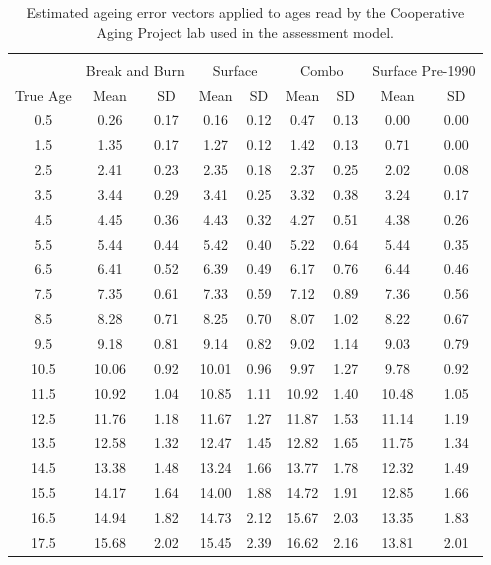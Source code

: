 \documentclass[12pt,]{article}
\begin{document}
\newpage

\FloatBarrier

\begin{table}[ht]
\centering
\caption{Estimated ageing error vectors applied to ages read by the Cooperative Aging Project lab used in the assessment model.} 
\label{tab:age_error1}
\begin{tabular}{ccccccccc}
  \hline
 &  &  &  &  &  &  &  &  \\ 
   & \multicolumn{2}{c}{Break and Burn} &  \multicolumn{2}{c}{Surface} & \multicolumn{2}{c}{Combo} & \multicolumn{2}{c}{Surface Pre-1990} \\
 True Age & Mean & SD & Mean &  SD  & Mean &  SD & Mean & SD \\
 \hline
0.5 & 0.26 & 0.17 & 0.16 & 0.12 & 0.47 & 0.13 & 0.00 & 0.00 \\ 
  1.5 & 1.35 & 0.17 & 1.27 & 0.12 & 1.42 & 0.13 & 0.71 & 0.00 \\ 
  2.5 & 2.41 & 0.23 & 2.35 & 0.18 & 2.37 & 0.25 & 2.02 & 0.08 \\ 
  3.5 & 3.44 & 0.29 & 3.41 & 0.25 & 3.32 & 0.38 & 3.24 & 0.17 \\ 
  4.5 & 4.45 & 0.36 & 4.43 & 0.32 & 4.27 & 0.51 & 4.38 & 0.26 \\ 
  5.5 & 5.44 & 0.44 & 5.42 & 0.40 & 5.22 & 0.64 & 5.44 & 0.35 \\ 
  6.5 & 6.41 & 0.52 & 6.39 & 0.49 & 6.17 & 0.76 & 6.44 & 0.46 \\ 
  7.5 & 7.35 & 0.61 & 7.33 & 0.59 & 7.12 & 0.89 & 7.36 & 0.56 \\ 
  8.5 & 8.28 & 0.71 & 8.25 & 0.70 & 8.07 & 1.02 & 8.22 & 0.67 \\ 
  9.5 & 9.18 & 0.81 & 9.14 & 0.82 & 9.02 & 1.14 & 9.03 & 0.79 \\ 
  10.5 & 10.06 & 0.92 & 10.01 & 0.96 & 9.97 & 1.27 & 9.78 & 0.92 \\ 
  11.5 & 10.92 & 1.04 & 10.85 & 1.11 & 10.92 & 1.40 & 10.48 & 1.05 \\ 
  12.5 & 11.76 & 1.18 & 11.67 & 1.27 & 11.87 & 1.53 & 11.14 & 1.19 \\ 
  13.5 & 12.58 & 1.32 & 12.47 & 1.45 & 12.82 & 1.65 & 11.75 & 1.34 \\ 
  14.5 & 13.38 & 1.48 & 13.24 & 1.66 & 13.77 & 1.78 & 12.32 & 1.49 \\ 
  15.5 & 14.17 & 1.64 & 14.00 & 1.88 & 14.72 & 1.91 & 12.85 & 1.66 \\ 
  16.5 & 14.94 & 1.82 & 14.73 & 2.12 & 15.67 & 2.03 & 13.35 & 1.83 \\ 
  17.5 & 15.68 & 2.02 & 15.45 & 2.39 & 16.62 & 2.16 & 13.81 & 2.01 \\ 
   \hline
\end{tabular}
\end{table}
\end{document}
